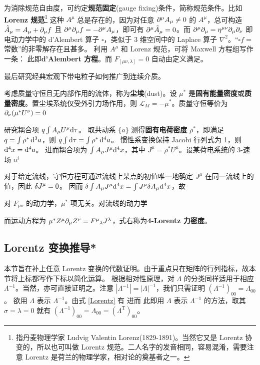 为消除规范自由度，可约定\textbf{规范固定}(gauge fixing)条件，简称规范条件。比如\textbf{Lorenz 规范}\footnote{指丹麦物理学家 Ludvig Valentin Lorenz(1829-1891)。当然它又是 Lorentz 协变的，所以也可叫做 Lorentz 规范。二人名字的发音相同，容易混淆，需要注意 Lorentz 是荷兰的物理学家，相对论的奠基者之一。}
这种 $A^\mu$ 总是存在的，因为对任意 $\partial^\mu A_\mu \ne 0$ 的 $A^\mu$，总可构造 $\tilde A_\mu = A_\mu + \partial_\mu f$ 且 $\partial^\mu\partial_\mu f=-\partial^\mu A_\mu $，即可有 $\partial^\mu \tilde A_\mu =0$。而 $\partial^\mu\partial_\mu=\eta^{\mu\nu}\partial_{\mu}\partial_{\nu}$ 即电动力学中的 d'Alembert 算子 $\square$，类似于 3 维空间中的 Laplace 算子 $\nabla^2$。“$\square f =$\,常数”的非零解存在且甚多。
利用 $A^\mu$ 和 Lorenz 规范，可将 Maxwell 方程组写作一条：
此即\textbf{d'Alembert 方程}。而 $F_{[\mu\nu,\lambda]}=0$ 自动由定义满足。

最后研究经典宏观下带电粒子如何推广到连续介质。

考虑质量守恒且无内部作用的流体，称为\textbf{尘埃}(dust)。设 $\mu^*$ 是\textbf{固有能量密度}或\textbf{质量密度}。置尘埃系统仅受外引力场作用，则 $\mathcal L_M=-\mu^*$。质量守恒等价为 $\partial_\nu(\mu^* U^\nu)=0$

研究耦合项 $q\int A_\mu U^\mu \dd\tau$。 
取共动系 $\{a\}$ 测得\textbf{固有电荷密度} $\rho^*$，即满足 $q=\int\rho^*\dd[3]{a}$，则 $q\int\dd\tau=\int\rho^*\dd[4]{a}$。
惯性系变换保持 Jacobi 行列式为 1，则 $\dd[4]x =\dd[4]{a}$。
进而耦合项为 $\int A_\mu J^\mu \dd[4]x$，其中 $J^\mu=\rho^*U^\mu$。设某荷电系统的 3-速场 $u^i$


对于给定流线，守恒⽅程可通过流线上某点的初值唯⼀地确定 $J^\mu$ 在同⼀流线上的值，因此 $\var J^\mu=0$。
因而 $\var\int A_\mu J^\mu \dd[4]x=\int J^\mu \delta A_\mu \dd[4]x$，故

对 $F_{\mu\nu}$ 的动力学，$\mu^*$ 项无关。对流线的动力学


而运动方程为 $\mu^* Z^\mu\partial_\mu Z^\nu=F^\mu{}_{\lambda}J^\lambda$，式右称为\textbf{4-Lorentz 力密度}。




\subsection{Lorentz 变换推导*}\label{sec:PoincareLorentz}

本节旨在补上任意 Lorentz 变换的代数证明。由于重点只在矩阵的行列指标，故本节将上标都写作下标以简化运算。
根据相对性原理，对 $\Lambda$ 的分类同样适用于相应 $\Lambda^{-1}$。当然，亦可直接证明之。注意 $|\Lambda^{-1}|=|\Lambda|^{-1}$，我们只需证明 $(\Lambda^{-1})_{00}=\Lambda_{00}$。
欲用 $\Lambda$ 表示 $\Lambda^{-1}$。由式 \eqref{Lorentz} 有
进而
此即用 $\Lambda$ 表示 $\Lambda^{-1}$ 的方法，取其 $\sigma=\lambda=0$ 就有 $(\Lambda^{-1})_{00}=\Lambda_{00}=(\Lambda^\mathrm{T})_{00}$。

